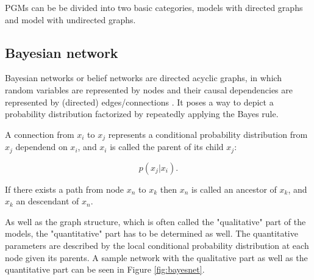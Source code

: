 PGMs can be be divided into two basic categories, models with directed graphs and model with undirected graphs.


\subsection{Bayesian network} \label{c:bayesnet}

Bayesian networks or belief networks are directed acyclic graphs, in which random variables are represented by nodes and their causal dependencies are represented by (directed) edges/connections \cite{Faltin2007} \cite{Goodfellow-et-al-2016-Book}. 
It poses a way to depict a probability distribution factorized by repeatedly applying the Bayes rule.

A connection from $x_i$ to $x_j$ represents a conditional probability distribution from $x_j$ dependend on $x_i$, and $x_i$ is called the parent of its child $x_j$:

\[
p(x_j | x_i) .
\]


If there exists a path from node $x_n$ to $x_k$ then $x_n$ is called an ancestor of $x_k$, and $x_k$ an descendant of $x_n$. 

As well as the graph structure, which is often called the "qualitative" part of the models, the "quantitative" part has to be determined as well.
The quantitative parameters are described by the local conditional probability distribution at each node given its parents.
A sample network with the qualitative part as well as the quantitative part can be seen in Figure \ref{fig:bayesnet}. 

